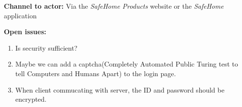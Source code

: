 \documentclass[twoside,11pt]{article}
\begin{document}
\begin{center}
{{\begin{multicols}{2}
                \textbf{Channel to actor:} Via the \emph{SafeHome Products} website or the \emph{SafeHome} application

                \textbf{Open issues:}

                \begin{enumerate}
                    \item Is security sufficient? 
                    \item Maybe we can add a captcha(Completely Automated Public Turing test to tell Computers and Humans Apart) to the login page.
                    \item When client commucating with server, the ID and password should be encrypted.
                \end{enumerate}

            \end{multicols}}}
\end{center}

\newpage
\end{document}
